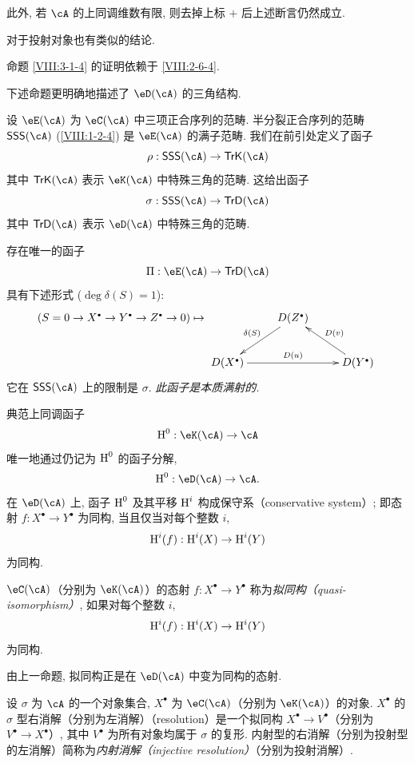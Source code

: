 此外, 若 $\cA$ 的上同调维数有限, 则去掉上标 $+$ 后上述断言仍然成立.

对于投射对象也有类似的结论.

命题 \ref{VIII:3-1-4} 的证明依赖于 \ref{VIII:2-6-4}.

下述命题更明确地描述了 $\eD(\cA)$ 的三角结构.

设 $\eE(\cA)$ 为 $\eC(\cA)$ 中三项正合序列的范畴. 半分裂正合序列的范畴 $\mathsf{SSS}(\cA)$ (\ref{VIII:1-2-4}) 是 $\eE(\cA)$ 的满子范畴. 我们在前引处定义了函子
\[
  \rho:\mathsf{SSS}(\cA) \to \mathsf{TrK}(\cA)
\]
其中 $\mathsf{TrK}(\cA)$ 表示 $\eK(\cA)$ 中特殊三角的范畴. 这给出函子
\[
  \sigma : \mathsf{SSS}(\cA) \to \mathsf{TrD}(\cA)
\]
其中 $\mathsf{TrD}(\cA)$ 表示 $\eD(\cA)$ 中特殊三角的范畴.

\begin{proposition}\label{VIII:3-1-5}
存在唯一的函子
\[
  \Pi:\eE(\cA) \to \mathsf{TrD}(\cA)
\]
具有下述形式 ($\deg \delta(S)=1$):
\[
(S=0 \to X^\bullet \to Y^\bullet \to Z^\bullet \to 0)
\mapsto
\xymatrix{
  & D(Z^\bullet) \ar[dl]_-{\delta(S)} \\
  D(X^\bullet) \ar[rr]^-{D(u)}
    & & D(Y^\bullet) \ar[ul]_-{D(v)}
}
\]
它在 $\mathsf{SSS}(\cA)$ 上的限制是 $\sigma$. \emph{此函子是本质满射的.}
\end{proposition}

\begin{proposition}\label{VIII:3-1-6}
典范上同调函子
\[
  \h^0:\eK(\cA) \to \cA
\]
唯一地通过仍记为 $\operatorname{H}^0$ 的函子分解,
\[
  \h^0:\eD(\cA) \to \cA \text{.}
\]
在 $\eD(\cA)$ 上, 函子 $\operatorname{H}^0$ 及其平移 $\operatorname{H}^i$ 构成保守系（conservative system）; 即态射 $f:X^\bullet \to Y^\bullet$ 为同构, 当且仅当对每个整数 $i$,
\[
  \operatorname{H}^i(f):\operatorname{H}^i(X) \to \operatorname{H}^i(Y)
\]
为同构.
\end{proposition}

\begin{definition}\label{VIII:3-1-7}
$\eC(\cA)$（分别为 $\eK(\cA)$）的态射 $f:X^\bullet \to Y^\bullet$ 称为\emph{拟同构（quasi-isomorphism）}, 如果对每个整数 $i$,
\[
  \operatorname{H}^i(f):\operatorname{H}^i(X) \to \operatorname{H}^i(Y)
\]
为同构.
\end{definition}

由上一命题, 拟同构正是在 $\eD(\cA)$ 中变为同构的态射.

\begin{definition}\label{VIII:3-1-8}
设 $\sigma$ 为 $\cA$ 的一个对象集合, $X^\bullet$ 为 $\eC(\cA)$（分别为 $\eK(\cA)$）的对象. $X^\bullet$ 的 $\sigma$ 型右消解（分别为左消解）（resolution）是一个拟同构 $X^\bullet \to V^\bullet$（分别为 $V^\bullet \to X^\bullet$）, 其中 $V^\bullet$ 为所有对象均属于 $\sigma$ 的复形. 内射型的右消解（分别为投射型的左消解）简称为\emph{内射消解（injective resolution）}（分别为投射消解）.
\end{definition}

